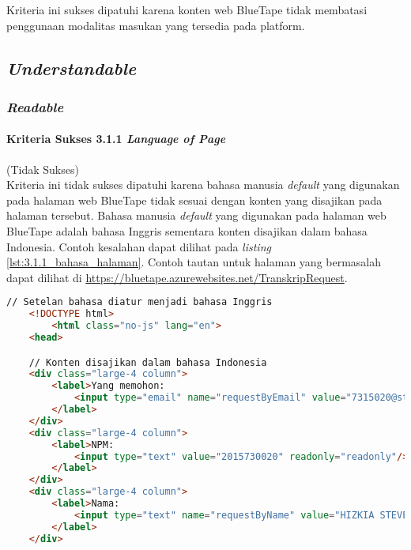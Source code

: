 Kriteria ini sukses dipatuhi karena konten web BlueTape tidak membatasi penggunaan modalitas masukan yang tersedia pada platform.

\subsection{\textit{Understandable}}
\label{subsec:kepatuhan_bluetape_understandable}

\subsubsection{\textit{Readable}}
\label{subsubsec:kepatuhan_bluetape_readable}

\paragraph{Kriteria Sukses 3.1.1 \textit{Language of Page}}
\label{par:kepatuhan_bluetape_kriteria_sukses_3.1.1}
(Tidak Sukses)\\

Kriteria ini tidak sukses dipatuhi karena bahasa manusia \textit{default} yang digunakan pada halaman web BlueTape tidak sesuai dengan konten yang disajikan pada halaman tersebut. Bahasa manusia \textit{default} yang digunakan pada halaman web BlueTape adalah bahasa Inggris sementara konten disajikan dalam bahasa Indonesia. Contoh kesalahan dapat dilihat pada \textit{listing} \ref{lst:3.1.1_bahasa_halaman}. Contoh tautan untuk halaman yang bermasalah dapat dilihat di \url{https://bluetape.azurewebsites.net/TranskripRequest}.

\begin{lstlisting}[frame=single, label={lst:3.1.1_bahasa_halaman}, language=HTML, caption=Kriteria Sukses 3.1.1 - Bahasa yang Tidak Sesuai]
    // Setelan bahasa diatur menjadi bahasa Inggris
    <!DOCTYPE html>
        <html class="no-js" lang="en">
    <head>

    // Konten disajikan dalam bahasa Indonesia
    <div class="large-4 column">
        <label>Yang memohon:
            <input type="email" name="requestByEmail" value="7315020@student.unpar.ac.id" readonly="readonly"/>
        </label>
    </div>
    <div class="large-4 column">
        <label>NPM:
            <input type="text" value="2015730020" readonly="readonly"/>
        </label>
    </div>
    <div class="large-4 column">
        <label>Nama:
            <input type="text" name="requestByName" value="HIZKIA STEVEN" readonly="readonly"/>
        </label>
    </div>
\end{lstlisting}

